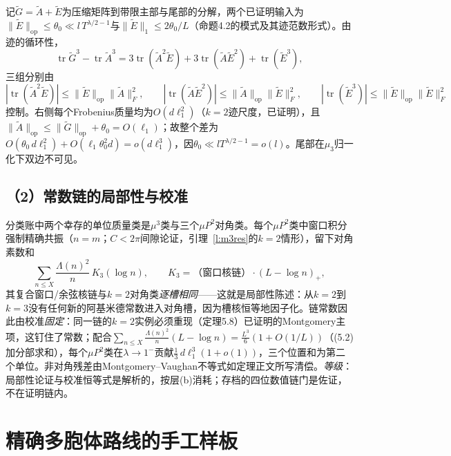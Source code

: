 \documentclass[11pt]{article}
\numberwithin{equation}{section}
\theoremstyle{definition}
\theoremstyle{remark}
\begin{document}
记$\widetilde G=\widetilde A+\widetilde E$为压缩矩阵到带限主部与尾部的分解，两个已证明输入为$\|\widetilde E\|_{\mathrm{op}}\le\theta_0\ll l\,T^{\lambda/2-1}$与$\|\widetilde E\|_{1}\le 2\theta_0/L$（\cite{C26}命题4.2的模式及其迹范数形式）。由迹的循环性，
\[
\operatorname{tr}\widetilde G^{3}-\operatorname{tr}\widetilde A^{3}
=3\operatorname{tr}(\widetilde A^{2}\widetilde E)
+3\operatorname{tr}(\widetilde A\widetilde E^{2})
+\operatorname{tr}(\widetilde E^{3}),
\]
三组分别由
\[
|\operatorname{tr}(\widetilde A^{2}\widetilde E)|
\le\|\widetilde E\|_{\mathrm{op}}\|\widetilde A\|_{F}^{2},\qquad
|\operatorname{tr}(\widetilde A\widetilde E^{2})|
\le\|\widetilde A\|_{\mathrm{op}}\|\widetilde E\|_{F}^{2},\qquad
|\operatorname{tr}(\widetilde E^{3})|
\le\|\widetilde E\|_{\mathrm{op}}\|\widetilde E\|_{F}^{2}
\]
控制。右侧每个Frobenius质量均为$O(d\ell_1^{2})$（$k=2$迹尺度，\cite{C26}已证明），且$\|\widetilde A\|_{\mathrm{op}}\le\|\widetilde G\|_{\mathrm{op}}+\theta_0=O(\ell_1)$；故整个差为$O(\theta_0\,d\ell_1^{2})+O(\ell_1\theta_0^{2}d)=o(d\ell_1^{3})$，因$\theta_0\ll lT^{\lambda/2-1}=o(l)$。尾部在$\mu_3$归一化下双边不可见。

\subsection*{（2）常数链的局部性与校准}

分类账中两个幸存的单位质量类是$\mu^{3}$类与三个$\mu P^{2}$对角类。每个$\mu P^{2}$类中窗口积分强制精确共振（$n=m$；$C<2\pi$间隙论证，引理~\ref{l:m3res}的$k=2$情形），留下对角素数和
\[
\sum_{n\le X}\frac{\Lambda(n)^{2}}{n}\,K_3(\log n),\qquad
K_3=\text{（窗口核链）}\cdot(L-\log n)_{+},
\]
其复合窗口/余弦核链与$k=2$对角类\emph{逐槽相同}——这就是局部性陈述：从$k=2$到$k=3$没有任何新的阿基米德常数进入对角槽，因为槽核恒等地因子化。链常数因此由校准\emph{固定}：同一链的$k=2$实例必须重现\cite{C26}（定理5.8）已证明的Montgomery主项，这钉住了常数；配合$\sum_{n\le X}\frac{\Lambda(n)^{2}}{n}(L-\log n)=\tfrac{L^{3}}{6}(1+O(1/L))$（\cite{C26}(5.2)加分部求和），每个$\mu P^{2}$类在$\lambda\to1^-$贡献$\tfrac13\,d\ell_1^{3}(1+o(1))$，三个位置和为第二个单位。非对角残差由Montgomery--Vaughan不等式如定理正文所写清偿。\emph{等级}：局部性论证与校准恒等式是解析的，按层(b)消耗；存档的四位数值链门是佐证，不在证明链内。

\section{精确多胞体路线的手工样板}\label{a:worked}
\end{document}
